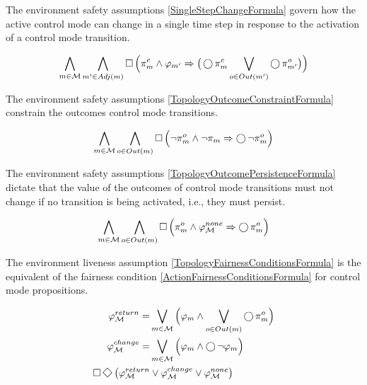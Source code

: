 The environment safety assumptions \eqref{SingleStepChangeFormula} govern how the active control mode can change in a single time step in response to the activation of a control mode transition.

\begin{equation}\label{SingleStepChangeFormula}
	\bigwedge \limits_{m \in \mathcal{M}} \bigwedge \limits_{m^\prime \in Adj(m)} \operatorname{\Box} \Big( \pi_m^c \wedge  \varphi_{m^\prime} \Rightarrow \big( \operatorname{\bigcirc} \pi_{m}^c \bigvee \limits_{o \in Out(m^\prime)} \operatorname{\bigcirc} \pi_{m^\prime}^o \big) \Big)
\end{equation}

The environment safety assumptions \eqref{TopologyOutcomeConstraintFormula} constrain the outcomes control mode transitions.

\begin{equation}\label{TopologyOutcomeConstraintFormula}
	\bigwedge \limits_{m \in \mathcal{M}} \bigwedge \limits_{o \in Out(m)} \operatorname{\Box} \Big( \lnot \pi_m^o \wedge \lnot \pi_m \Rightarrow \operatorname{\bigcirc} \lnot \pi_m^o \Big)
\end{equation}

The environment safety assumptions \eqref{TopologyOutcomePersistenceFormula} dictate that the value of the outcomes of control mode transitions must not change if no transition is being activated, i.e., they must persist.

\begin{equation}\label{TopologyOutcomePersistenceFormula}
	\bigwedge \limits_{m \in \mathcal{M}} \bigwedge \limits_{o \in Out(m)} \operatorname{\Box} \Big( \pi_m^o \wedge \varphi_\mathcal{M}^{none} \Rightarrow \operatorname{\bigcirc} \pi_m^o \Big)
\end{equation}

The environment liveness assumption \eqref{TopologyFairnessConditionsFormula} is the equivalent of the fairness condition \eqref{ActionFairnessConditionsFormula} for control mode propositions.

\begin{subequations}
	\begin{align}
		\varphi_\mathcal{M}^{return} = &\bigvee \limits_{m \in \mathcal{M}} \Big( \varphi_m \wedge \bigvee \limits_{o \in Out(m)} \LTLX \pi_m^o \Big)\label{TopologyFairnessConditionsFormula1}\\
		\varphi_\mathcal{M}^{change} = &\bigvee \limits_{m \in \mathcal{M}} \Big( \varphi_m \wedge \LTLX \lnot \varphi_m \Big)\label{TopologyFairnessConditionsFormula2}\\
		\LTLG \LTLF \big( \varphi_\mathcal{M}^{return} &\vee \varphi_\mathcal{M}^{change} \vee \varphi_\mathcal{M}^{none} \big)\label{TopologyFairnessConditionsFormula}
	\end{align}
\end{subequations}

